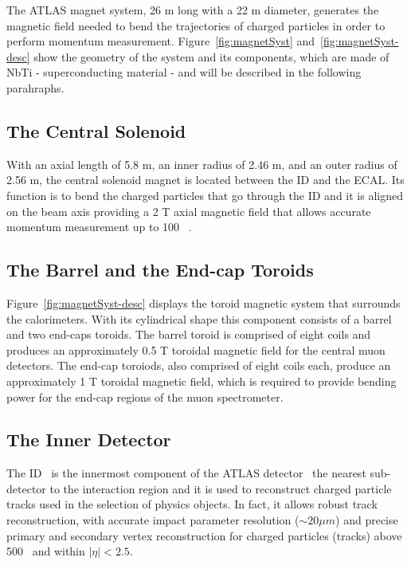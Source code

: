 			\noindent The \ac{ATLAS} magnet system, 26 m long with a 22 m diameter, generates the magnetic field needed to bend the trajectories of charged particles in order to perform momentum measurement. Figure~\ref{fig:magnetSyst} and~\ref{fig:magnetSyst-desc} show the geometry of the system and its components, which are made of NbTi - superconducting material - and will be described in the following parahraphs. 



			\subsection*{The Central Solenoid}

				With an axial length of 5.8 m, an inner radius of 2.46 m, and an outer radius of 2.56 m, the central solenoid magnet is located between the \ac{ID} and the \ac{ECAL}. Its function is to bend the charged particles that go through the \ac{ID} and it is aligned on the beam axis providing a 2 T axial magnetic field that allows accurate momentum measurement up to 100 \GeV~\cite{YAMAMOTO200853}.

			\subsection*{The Barrel and the End-cap Toroids}

				Figure~\ref{fig:magnetSyst-desc} displays the toroid magnetic system that surrounds the calorimeters. With its cylindrical shape this component consists of a barrel and two end-caps toroids. The barrel toroid is comprised of eight coils and produces an approximately 0.5 T toroidal magnetic field for the central muon detectors. The end-cap toroiods, also comprised of eight coils each, produce an approximately 1 T toroidal magnetic field, which is required to provide bending power for the end-cap regions of the muon spectrometer.
				
		\subsection{The Inner Detector}
		\label{sec:ID}

			The \ac{ID}~\cite{ATLASInDet} is the innermost component of the \ac{ATLAS} detector \ie\ the nearest sub-detector to the interaction region and it is used to reconstruct charged particle tracks used in the selection of physics objects. In fact, it allows robust track reconstruction, with accurate impact parameter resolution ($\sim 20 \mu m$) and precise primary and secondary vertex reconstruction for charged particles (tracks) above 500 \MeV\ and within $\displaystyle|\eta| < 2.5$.

